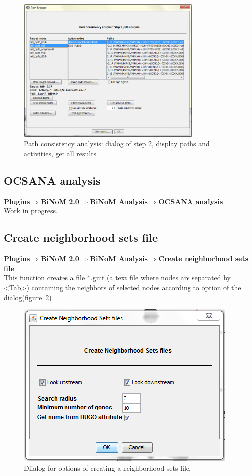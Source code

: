 \begin{figure}
\centering
\includegraphics[width=0.8\textwidth]{graphics/Path_consistency_analyser_Dialog2}
\caption{Path consistency analysis: dialog of step 2, display paths and activities, get all results}
\label{Path_consistency_analyser_Dialog2}
\end{figure}  

\subsection{OCSANA analysis}
\textbf{Plugins$\Rightarrow$BiNoM 2.0$\Rightarrow$BiNoM Analysis$\Rightarrow$OCSANA analysis}\\

Work in progress.

\subsection{Create neighborhood sets file}
\textbf{Plugins$\Rightarrow$BiNoM 2.0$\Rightarrow$BiNoM Analysis$\Rightarrow$Create neighborhood sets file}\\
This function creates a file *.gmt (a text file where nodes are separated by \textless Tab\textgreater) containing the neighbors of selected nodes according to option of the dialog(figure~\ref{Create_Neigborhood_File_Dialog})
\begin{figure}
\centering
\includegraphics[width=7 cm]{graphics/Create_Neigborhood_File_Dialog}
\caption{Diialog for options of creating a neighborhood sets file.}
\label{Create_Neigborhood_File_Dialog}
\end{figure}  